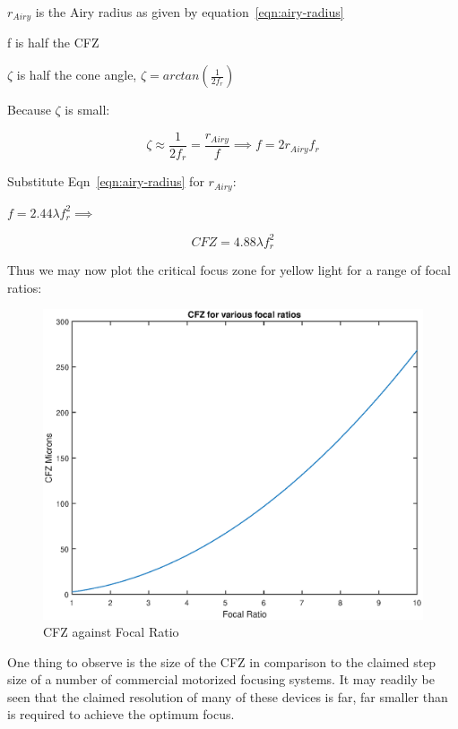 \documentclass[11pt]{article}
\begin{document}
$r_{Airy}$ is the Airy radius as given by equation~\ref{eqn:airy-radius}

f is half the CFZ

$\zeta$ is half the cone angle, $\zeta = arctan(\frac{1}{2f_{r}})$

Because $\zeta$ is small:

\Large
\begin{equation}
\zeta \approx \frac{1}{2f_{r}} = \frac{r_{Airy}}{f} \implies f=2r_{Airy}f_{r}
\label{eqn:physical-spot-size}
\end{equation}
\large

Substitute Eqn~\ref{eqn:airy-radius} for $r_{Airy}$:

$f=2.44\lambda f_{r}^2 \implies$

\begin{equation}
CFZ=4.88\lambda f_{r}^2
\end{equation}

Thus we may now plot the critical focus zone for yellow light for a range of focal ratios:

\begin{figure}[htb]
	\begin{center}
		\includegraphics[scale=0.7]{./images/cfz-fratio.eps}
		\caption{CFZ against Focal Ratio}
		\label{fig:cfz-plot}
	\end{center}
\end{figure}

One thing to observe is the size of the CFZ in comparison to the claimed step size of a number of commercial motorized focusing systems. It may readily be seen that the claimed resolution of many of these devices is far, far smaller than is required to achieve the optimum focus.  
\end{document}
